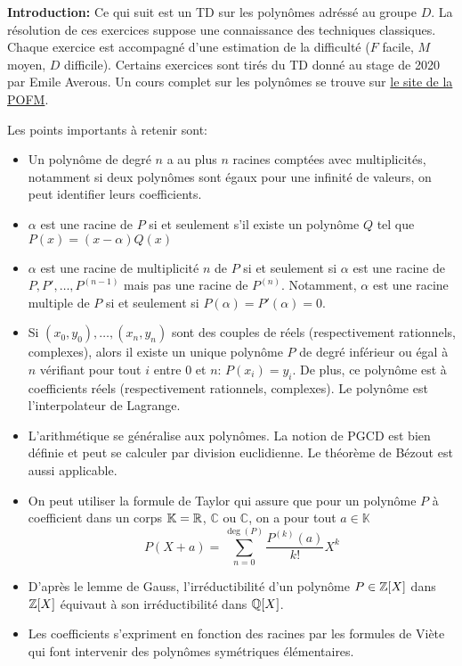 \textbf{Introduction:} Ce qui suit est un TD sur les polynômes adréssé au groupe $D$. La résolution de ces exercices suppose une connaissance des techniques classiques. Chaque exercice est accompagné d'une estimation de la difficulté ($F$ facile, $M$ moyen, $D$ difficile). Certains exercices sont tirés du TD donné au stage de 2020 par Emile Averous. Un cours complet sur les polynômes se trouve sur \href{https://maths-olympiques.fr/wp-content/uploads/2017/09/polynomes.pdf}{le site de la POFM}.

Les points importants à retenir sont:
\begin{itemize}
    \item Un polynôme de degré $n$ a au plus $n$ racines comptées avec multiplicités, notamment si deux polynômes sont égaux pour une infinité de valeurs, on peut identifier leurs coefficients.
    \item $\alpha$ est une racine de $P$ si et seulement s'il existe un polynôme $Q$ tel que $P(x)=(x-\alpha)Q(x)$
    \item $\alpha$ est une racine de multiplicité $n$ de $P$ si et seulement si $\alpha$ est une racine de $P,P',\ldots,P^{(n-1)}$ mais pas une racine de $P^{(n)}$. Notamment, $\alpha$ est une racine multiple de $P$ si et seulement si $P(\alpha)=P'(\alpha)=0$.
    \item Si $(x_0,y_0),\ldots,(x_n,y_n)$ sont des couples de réels (respectivement rationnels, complexes), alors il existe un unique polynôme $P$ de degré inférieur ou égal à $n$ vérifiant pour tout $i$ entre $0$ et $n$: $P(x_i)=y_i$. De plus, ce polynôme est à coefficients réels (respectivement rationnels, complexes). Le polynôme est l'interpolateur de Lagrange.
    \item  L'arithmétique se généralise aux polynômes. La notion de PGCD est bien définie et peut se calculer par division euclidienne. Le théorème de Bézout est aussi applicable.
    \item On peut utiliser la formule de Taylor qui assure que pour un polynôme $P$ à coefficient dans un corps $\mathbb{K}=\mathbb R$, $\mathbb{C}$ ou $\mathbb{C}$, on a pour tout $a\in \mathbb{K}$ 
    $$P(X+a)=\sum_{n=0}^{\deg(P)}\frac{P^{(k)}(a)}{k!}X^k $$
    \item  D'après le lemme de Gauss, l'irréductibilité d'un polynôme $P\in \mathbb Z[X]$ dans $\mathbb Z[X]$ équivaut à son irréductibilité dans $\mathbb Q[X]$.
    \item Les coefficients s'expriment en fonction des racines par les formules de Viète qui font intervenir des polynômes symétriques élémentaires.
\end{itemize}
